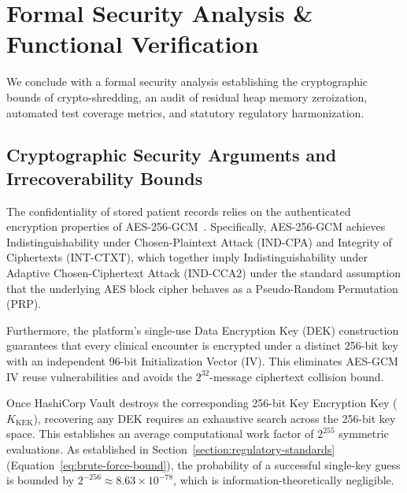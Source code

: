 
\section{Formal Security Analysis \& Functional Verification}\label{section:security-analysis}

We conclude with a formal security analysis establishing the cryptographic bounds of crypto-shredding, an audit of residual heap memory zeroization, automated test coverage metrics, and statutory regulatory harmonization.

\subsection{Cryptographic Security Arguments and Irrecoverability Bounds}\label{section:cryptographic-security}

The confidentiality of stored patient records relies on the authenticated encryption properties of AES-256-GCM~\cite{dworkin_gcm_2007, boneh_shoup_2020}. Specifically, AES-256-GCM achieves Indistinguishability under Chosen-Plaintext Attack (IND-CPA) and Integrity of Ciphertexts (INT-CTXT), which together imply Indistinguishability under Adaptive Chosen-Ciphertext Attack (IND-CCA2) under the standard assumption that the underlying AES block cipher behaves as a Pseudo-Random Permutation (PRP).

Furthermore, the platform's single-use Data Encryption Key (DEK) construction guarantees that every clinical encounter is encrypted under a distinct 256-bit key with an independent 96-bit Initialization Vector (IV). This eliminates AES-GCM IV reuse vulnerabilities and avoids the $2^{32}$-message ciphertext collision bound.

Once HashiCorp Vault destroys the corresponding 256-bit Key Encryption Key ($K_{\text{KEK}}$), recovering any DEK requires an exhaustive search across the 256-bit key space. This establishes an average computational work factor of $2^{255}$ symmetric evaluations. As established in Section~\ref{section:regulatory-standards} (Equation~\ref{eq:brute-force-bound}), the probability of a successful single-key guess is bounded by $2^{-256} \approx 8.63 \times 10^{-78}$, which is information-theoretically negligible.

